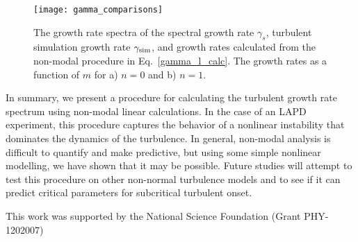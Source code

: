 \documentclass[letter,scriptaddress,twocolumn, prl,showkeys]{revtex4}
\begin{document}
\begin{figure}
\centerline{\texttt{[image: gamma\_comparisons]}}
\caption{The growth rate spectra of the spectral growth rate $\gamma_s$, turbulent simulation growth rate $\gamma_{\rm{sim}}$, and growth rates calculated from the non-modal procedure in Eq.~\ref{gamma_l_calc}.
The growth rates as a function of $m$ for a) $n=0$ and b) $n=1$.}
\label{gamma_comparisons}
\end{figure}

In summary, we present a procedure for calculating the turbulent growth rate spectrum using non-modal linear calculations. 
In the case of an LAPD experiment, this procedure captures the behavior of a nonlinear instability that dominates the dynamics of the turbulence.  In general,
non-modal analysis is difficult to quantify and make predictive, but using some simple nonlinear modelling, we have shown
that it may be possible. Future studies will attempt to test this procedure on other non-normal turbulence models and to see if it can predict critical parameters for subcritical turbulent onset.

This work was supported by the National Science Foundation (Grant PHY-1202007)




\end{document}
